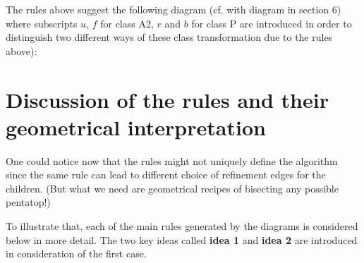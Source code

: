 \documentclass[a4paper,12pt]{amsart}
\numberwithin{equation}{section}
\begin{document}
The rules above suggest the following diagram (cf. with diagram in section 6) where subscripts $u$, $f$ for class A2, $r$ and $b$ for class P are introduced in order to distinguish two different ways of these class transformation due to the rules above):

\begin{center}
\end{center}

\section{Discussion of the rules and their geometrical interpretation}

One could notice now that the rules might not uniquely define the algorithm since the same rule can lead to different choice of refinement edges for the children. (But what we need are geometrical recipes of bisecting any possible pentatop!)

To illustrate that, each of the main rules generated by the diagrams is considered below in more detail. The two key ideas called \textbf{idea 1} and \textbf{idea 2} are introduced in consideration of the first case.
\end{document}
